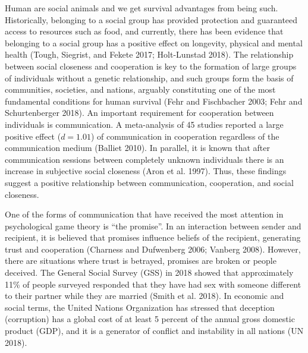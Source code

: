 \documentclass[smallextended]{svjour3}       %
\begin{document}
Human are social animals and we get survival advantages from being such.
Historically, belonging to a social group has provided protection and
guaranteed access to resources such as food, and currently, there has
been evidence that belonging to a social group has a positive effect on
longevity, physical and mental health (Tough, Siegrist, and Fekete 2017;
Holt-Lunstad 2018). The relationship between social closeness and
cooperation is key to the formation of large groups of individuals
without a genetic relationship, and such groups form the basis of
communities, societies, and nations, arguably constituting one of the
most fundamental conditions for human survival (Fehr and Fischbacher
2003; Fehr and Schurtenberger 2018). An important requirement for
cooperation between individuals is communication. A meta-analysis of 45
studies reported a large positive effect (\(d = 1.01\)) of communication
in cooperation regardless of the communication medium (Balliet 2010). In
parallel, it is known that after communication sessions between
completely unknown individuals there is an increase in subjective social
closeness (Aron et al. 1997). Thus, these findings suggest a positive
relationship between communication, cooperation, and social closeness.

One of the forms of communication that have received the most attention
in psychological game theory is ``the promise''. In an interaction
between sender and recipient, it is believed that promises influence
beliefs of the recipient, generating trust and cooperation (Charness and
Dufwenberg 2006; Vanberg 2008). However, there are situations where
trust is betrayed, promises are broken or people deceived. The General
Social Survey (GSS) in 2018 showed that approximately 11\% of people
surveyed responded that they have had sex with someone different to
their partner while they are married (Smith et al. 2018). In economic
and social terms, the United Nations Organization has stressed that
deception (corruption) has a global cost of at least 5 percent of the
annual gross domestic product (GDP), and it is a generator of conflict
and instability in all nations (UN 2018).
\end{document}
